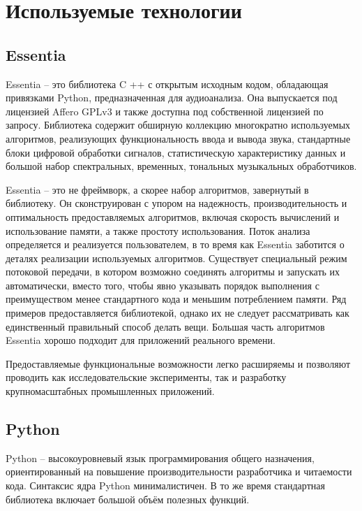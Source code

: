 \section{Используемые технологии}
\label{sec:development}

\subsection{Essentia}
\label{sec:development:essentia}

Essentia -- это библиотека C ++ с открытым исходным кодом, обладающая привязками Python, предназначенная для аудиоанализа. Она выпускается под лицензией Affero GPLv3 и также доступна под собственной лицензией по запросу. Библиотека содержит обширную коллекцию многократно используемых алгоритмов, реализующих функциональность ввода и вывода звука, стандартные блоки цифровой обработки сигналов, статистическую характеристику данных и большой набор спектральных, временных, тональных музыкальных обработчиков.

Essentia -- это не фреймворк, а скорее набор алгоритмов, завернутый в библиотеку. Он сконструирован с упором на надежность, производительность и оптимальность предоставляемых алгоритмов, включая скорость вычислений и использование памяти, а также простоту использования. Поток анализа определяется и реализуется пользователем, в то время как Essentia заботится о деталях реализации используемых алгоритмов. Существует специальный режим потоковой передачи, в котором возможно соединять алгоритмы и запускать их автоматически, вместо того, чтобы явно указывать порядок выполнения с преимуществом менее стандартного кода и меньшим потреблением памяти. Ряд примеров предоставляется библиотекой, однако их не следует рассматривать как единственный правильный способ делать вещи. Большая часть алгоритмов Essentia хорошо подходит для приложений реального времени.

Предоставляемые функциональные возможности легко расширяемы и позволяют проводить как исследовательские эксперименты, так и разработку крупномасштабных промышленных приложений.

\subsection{Python}
\label{sec:development:python}

Python -- высокоуровневый язык программирования общего назначения, ориентированный на повышение производительности разработчика и читаемости кода. Синтаксис ядра Python минималистичен. В то же время стандартная библиотека включает большой объём полезных функций.

